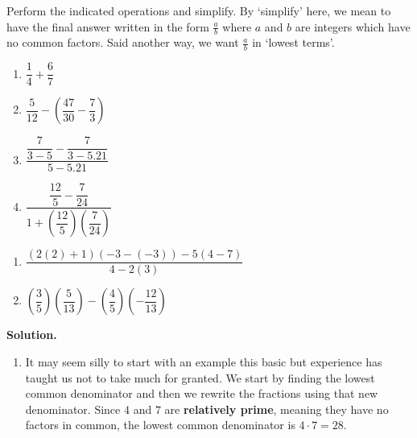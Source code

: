\begin{ex} \label{fractionreview}  Perform the indicated operations and simplify. By `simplify' here, we mean to have the final answer written in the form $\frac{a}{b}$ where $a$ and $b$ are integers which have no common factors.  Said another way, we want $\frac{a}{b}$ in `lowest terms'.

\begin{multicols}{4}
\begin{enumerate}

\item $\dfrac{1}{4} + \dfrac{6}{7}$
\item $\dfrac{5}{12} - \left(\dfrac{47}{30} - \dfrac{7}{3}\right)$
\item $\dfrac{\dfrac{7}{3-5} - \dfrac{7}{3-5.21}}{5-5.21}$
\item $\dfrac{\dfrac{12}{5} - \dfrac{7}{24}}{1 + \left(\dfrac{12}{5}\right) \left(\dfrac{7}{24}\right)}$ 

\setcounter{HW}{\value{enumi}}
\end{enumerate}
\end{multicols}


\begin{multicols}{2}
\begin{enumerate}
\setcounter{enumi}{\value{HW}}

\item $\dfrac{(2(2)+1)(-3-(-3)) - 5(4-7)}{4-2(3)}$
\item $\left(\dfrac{3}{5} \right) \left(\dfrac{5}{13} \right) - \left(\dfrac{4}{5}\right) \left( - \dfrac{12}{13}\right)$

\setcounter{HW}{\value{enumi}}
\end{enumerate}
\end{multicols}

{\bf Solution.}

\begin{enumerate}

\item It may seem silly to start with an example this basic but experience has taught us not to take much for granted.  We start by finding the lowest common denominator and then we rewrite the fractions using that new denominator.  Since $4$ and $7$ are {\bf relatively prime}, meaning they have no factors in common, the lowest common denominator is $4 \cdot 7 = 28$.\[ \begin{array}{rclr}


\end{array}\]
\end{enumerate}
\end{ex}
